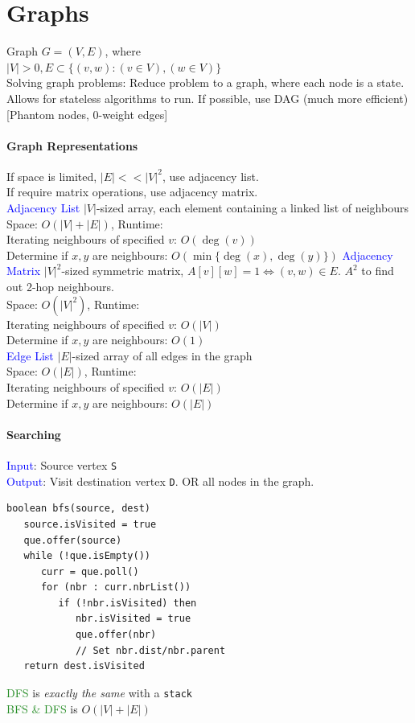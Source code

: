 \section{Graphs}
Graph $G=(V,E)$, where\\
$|V|>0, E\subset\{ (v,w) : (v\in V), (w\in V) \}$\\
Solving graph problems: Reduce problem to a graph, where each node
is a state. Allows for stateless algorithms to run. If possible, use DAG (much
more efficient) [Phantom nodes, 0-weight edges]
\paragraph{Graph Representations}
If space is limited, $|E|<<|V|^{2}$, use adjacency list.\\
If require matrix operations, use adjacency matrix.\\
\textcolor{Blue}{Adjacency List} 
$|V|$-sized array, each element containing a linked list of neighbours\\
\textcolor{Bittersweet}{Space}: $O(|V|+|E|)$, 
\textcolor{Bittersweet}{Runtime}:\\
Iterating neighbours of specified $v$: $O(\deg(v))$\\
Determine if $x, y$ are neighbours: $O(\min\{\deg(x), \deg(y)\})$
\textcolor{Blue}{Adjacency Matrix}
$|V|^{2}$-sized symmetric matrix, $A[v][w]=1\iff (v,w)\in E$.
$A^{2}$ to find out 2-hop neighbours.\\
\textcolor{Bittersweet}{Space}: $O(|V|^{2})$, 
\textcolor{Bittersweet}{Runtime}:\\
Iterating neighbours of specified $v$: $O(|V|)$\\
Determine if $x, y$ are neighbours: $O(1)$\\
\textcolor{Blue}{Edge List}
$|E|$-sized array of all edges in the graph\\
\textcolor{Bittersweet}{Space}: $O(|E|)$, 
\textcolor{Bittersweet}{Runtime}:\\
Iterating neighbours of specified $v$: $O(|E|)$\\
Determine if $x, y$ are neighbours: $O(|E|)$
\paragraph{Searching}
\textcolor{Blue}{Input}: Source vertex \verb|S|\\
\textcolor{Blue}{Output}: Visit destination vertex \verb|D|. OR all nodes in the graph.
\begin{verbatim}
boolean bfs(source, dest)
   source.isVisited = true
   que.offer(source)
   while (!que.isEmpty())
      curr = que.poll()
      for (nbr : curr.nbrList())
         if (!nbr.isVisited) then
            nbr.isVisited = true
            que.offer(nbr)
            // Set nbr.dist/nbr.parent
   return dest.isVisited
\end{verbatim}
\textcolor{ForestGreen}{DFS} is \emph{exactly the same} with a \verb|stack|\\
\textcolor{ForestGreen}{BFS \& DFS} is $O(|V| + |E|)$
